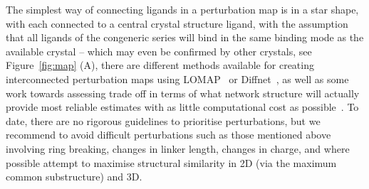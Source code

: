 \documentclass[9pt,bestpractices]{livecoms}
\begin{document}
The simplest way of connecting ligands in a perturbation map is in a star shape, with each connected to a central crystal structure ligand, with the assumption that all ligands of the congeneric series will bind in the same binding mode as the available crystal -- which may even be confirmed by other crystals, see Figure~\ref{fig:map} (A), there are different methods available for creating interconnected perturbation maps using LOMAP~\cite{liu_lead_2013} or Diffnet~\cite{xu_optimal_2019}, as well as some work towards assessing trade off in terms of what network structure will actually provide most reliable estimates with as little computational cost as possible~\cite{yang_optimal_2020, xu_optimal_2019}. To date, there are no rigorous guidelines to prioritise perturbations, but we recommend to avoid difficult perturbations such as those mentioned above involving ring breaking, changes in linker length, changes in charge, and where possible attempt to maximise structural similarity in 2D (via the maximum common substructure) and 3D.
\end{document}
